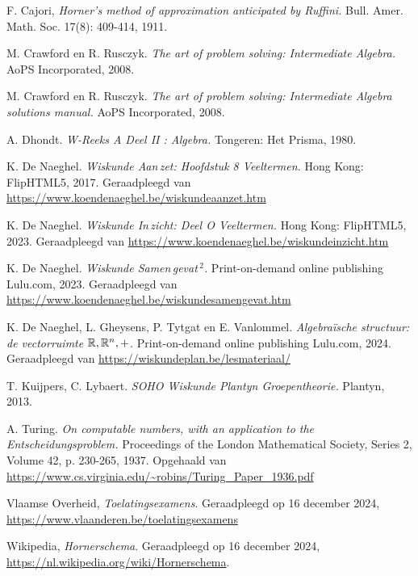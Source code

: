 \documentclass{ximera}
\begin{document}
{}
{}
\begin{thebibliography}{99}

F. Cajori, {\em Horner's method of approximation anticipated by Ruffini.} Bull. Amer. Math. Soc. 17(8): 409-414, 1911.

M. Crawford en R. Rusczyk. {\em The art of problem solving: Intermediate Algebra.} AoPS Incorporated, 2008.

M. Crawford en R. Rusczyk. {\em The art of problem solving: Intermediate Algebra solutions manual.} AoPS Incorporated, 2008.

A. Dhondt. {\em W-Reeks A Deel II : Algebra.} Tongeren: Het Prisma, 1980.

K. De Naeghel. {\em Wiskunde Aan\,zet: Hoofdstuk 8 Veeltermen.} Hong Kong: FlipHTML5, 2017. Geraadpleegd van \url{https://www.koendenaeghel.be/wiskundeaanzet.htm}

K. De Naeghel. {\em Wiskunde In\,zicht: Deel O Veeltermen.} Hong Kong: FlipHTML5, 2023. Geraadpleegd van \url{https://www.koendenaeghel.be/wiskundeinzicht.htm}

K. De Naeghel. {\em Wiskunde Samen\,gevat\,${}^{2}$.} Print-on-demand online publishing Lulu.com, 2023. Geraadpleegd van \url{https://www.koendenaeghel.be/wiskundesamengevat.htm} 

K. De Naeghel, L. Gheysens, P. Tytgat en E. Vanlommel. {\em Algebra\"ische structuur: de vectorruimte $\mathbb{R},\mathbb{R}^n,+$.} Print-on-demand online publishing Lulu.com, 2024. Geraadpleegd van \url{https://wiskundeplan.be/lesmateriaal/}

T. Kuijpers, C. Lybaert. {\em SOHO Wiskunde Plantyn Groepentheorie.} Plantyn, 2013.

A. Turing. {\em On computable numbers, with an application to the Entscheidungsproblem.} Proceedings of the London Mathematical Society, Series 2, Volume 42, p. 230-265, 1937. 
Opgehaald van \url{https://www.cs.virginia.edu/~robins/Turing_Paper_1936.pdf}

Vlaamse Overheid, {\em Toelatingsexamens}. Geraadpleegd op 16 december 2024, \url{https://www.vlaanderen.be/toelatingsexamens}

Wikipedia, {\em Hornerschema}. Geraadpleegd op 16 december 2024, \url{https://nl.wikipedia.org/wiki/Hornerschema}.

\end{thebibliography}
\end{document}
